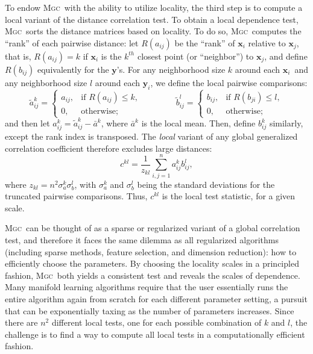 \documentclass[11pt]{article}
\providecommand{\sct}[1]{{\normalfont\textsc{#1}}}
\providecommand{\mt}[1]{\widetilde{#1}}
\providecommand{\mb}[1]{\boldsymbol{#1}}
\newcommand{\G}{c}
\newcommand{\Mgc}{\sct{Mgc}}
\newcommand{\mby}{\ensuremath{\mb{y}}}
\begin{document}
To endow \Mgc~with the ability to utilize locality, 
the third step is to compute a local variant of the distance correlation test.
To obtain a local dependence test, 
\Mgc~sorts the distance matrices based on locality.
To do so, \Mgc~computes the ``rank'' of each pairwise distance: 
let $R(a_{ij})$  be the ``rank'' of $\mb{x}_i$ relative to $\mb{x}_j$, that is, $R(a_{ij})=k$ if $\mb{x}_i$ is the $k^{th}$ closest point (or ``neighbor'') to $\mb{x}_j$, and define $R(b_{ij})$ equivalently for the \mby's. For any neighborhood size $k$ around each $\mb{x}_i$~and any neighborhood size $l$ around each $\mb{y}_i$, we define the local pairwise comparisons:
\begin{equation}
\label{localCoef2}
    \mt{a}_{ij}^k=
    \begin{cases}
      a_{ij}, & \text{if } R(a_{ij}) \leq k, \\
      0, & \text{otherwise};
    \end{cases} \qquad \qquad
    \mt{b}_{ij}^l=
    \begin{cases}
      b_{ij}, & \text{if } R(b_{ji}) \leq l, \\
      0, & \text{otherwise};
    \end{cases}
\end{equation}
and then let $a^k_{ij}=\mt{a}^k_{ij} - \bar{a}^k$, 
where $\bar{a}^k$ is the local mean. Then, define $b^k_{ij}$ similarly, except the rank index is transposed. 
The \emph{local} variant of any global generalized correlation coefficient therefore  excludes large distances: %
\begin{equation}
\label{localCoef}
\G^{kl}=\dfrac{1}{z_{kl}} {\textstyle \sum_{i,j=1}^n a_{ij}^k b_{ij}^l},
\end{equation}
where $z_{kl}=n^2 \sigma_a^k \sigma_b^l$,  with $\sigma_a^k$ and $\sigma_b^{l}$ being the standard deviations for the truncated pairwise comparisons. Thus, $c^{kl}$ is the local test statistic, for a given scale.


\Mgc~can be thought of as a sparse or regularized variant of a global correlation test, and therefore it faces the same dilemma as all regularized algorithms (including sparse methods, feature selection, and dimension reduction): how to efficiently choose the parameters. By choosing the locality scales in a principled fashion, \Mgc~both yields a consistent test and reveals the scales of dependence.  
Many manifold learning algorithms require that the user essentially runs the entire algorithm again from scratch for each different parameter setting, a pursuit that can be exponentially taxing as the number of parameters increases.  
Since there are $n^2$ different local tests, one for each possible combination of $k$ and $l$, the challenge is to find a way to compute all local tests in a computationally efficient fashion. 
\end{document}
